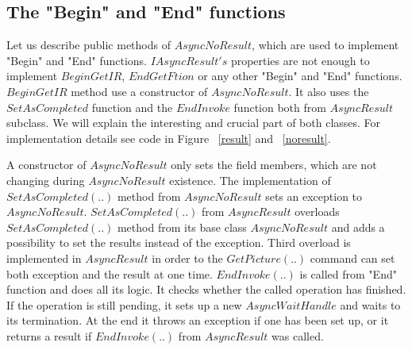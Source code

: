 \subsection*{The "Begin" and "End" functions} \label{sec:beginend}
	Let us describe public methods of $AsyncNoResult$, which are used to implement "Begin" and "End" functions.
	$IAsyncResult's$ properties are not enough to implement $BeginGetIR$,
	$EndGetFtion$ or any other "Begin" and "End" functions.
	$BeginGetIR$ method use a constructor of $AsyncNoResult$. It also uses the $SetAsCompleted$ function 
	and the $EndInvoke$ function both from $AsyncResult$ subclass.
	We will explain the interesting and crucial part of both classes. 
	For implementation details see code in Figure ~\ref{result} and ~\ref{noresult}.

	A constructor of $AsyncNoResult$ only sets the field members, 
	which are not changing during $AsyncNoResult$ existence.
	The implementation of $SetAsCompleted(..)$ method from $AsyncNoResult$ sets an exception to $AsyncNoResult$.
	$SetAsCompleted(..)$ from $AsyncResult$ overloads $SetAsCompleted(..)$ method
	from its base class $AsyncNoResult$ and adds a possibility to set the results instead of the exception.
	Third overload is implemented in $AsyncResult$ in order to the $GetPicture(..)$ command can set both 
	exception and the result at one time.
	$EndInvoke(..)$ is called from "End" function and does all its logic. It checks whether the called 
	operation has finished.	If the operation is still pending, it sets up a new $AsyncWaitHandle$
	and waits to its termination. At the end it throws an exception if one has been set up, 
	or it returns a result if $EndInvoke(..)$ from $AsyncResult$ was called.

